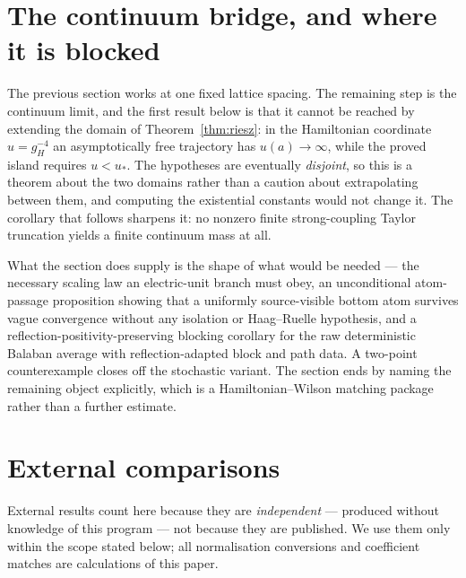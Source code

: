 \documentclass[11pt]{article}
\theoremstyle{plain}
\theoremstyle{definition}
\theoremstyle{remark}
\begin{document}


\section{The continuum bridge, and where it is blocked}\label{sec:g19}

The previous section works at one fixed lattice spacing. The remaining step is
the continuum limit, and the first result below is that it cannot be reached by
extending the domain of Theorem~\ref{thm:riesz}: in the Hamiltonian coordinate
$u=g_H^{-4}$ an asymptotically free trajectory has $u(a)\to\infty$, while the
proved island requires $u<u_*$. The hypotheses are eventually \emph{disjoint},
so this is a theorem about the two domains rather than a caution about
extrapolating between them, and computing the existential constants would not
change it. The corollary that follows sharpens it: no nonzero finite
strong-coupling Taylor truncation yields a finite continuum mass at all.

What the section does supply is the shape of what would be needed --- the
necessary scaling law an electric-unit branch must obey, an unconditional
atom-passage proposition showing that a uniformly source-visible bottom atom
survives vague convergence without any isolation or Haag--Ruelle hypothesis,
and a reflection-positivity-preserving blocking corollary for the raw
deterministic Balaban average with reflection-adapted block and path data. A
two-point counterexample closes off the stochastic variant. The section ends by
naming the remaining object explicitly, which is a Hamiltonian--Wilson matching
package rather than a further estimate.



\section{External comparisons}
\label{sec:external}

External results count here because they are \emph{independent} --- produced
without knowledge of this program --- not because they are published. We use
them only within the scope stated below; all normalisation conversions and
coefficient matches are calculations of this paper.
\end{document}
